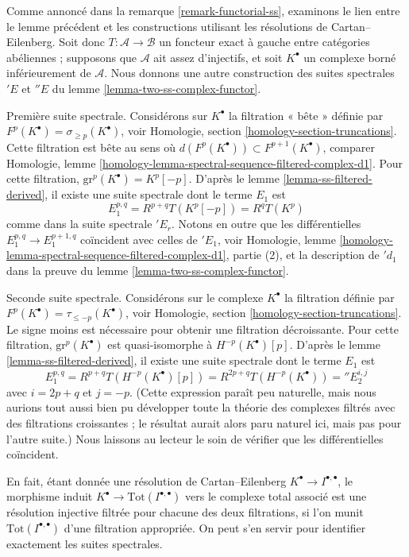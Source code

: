 \begin{remark}
\label{remark-final-functorial}
Comme annoncé dans la remarque \ref{remark-functorial-ss}, examinons le lien
entre le lemme précédent et les constructions utilisant les résolutions de
Cartan--Eilenberg. Soit donc $T : \mathcal{A} \to \mathcal{B}$ un foncteur
exact à gauche entre catégories abéliennes ; supposons que $\mathcal{A}$ ait
assez d'injectifs, et soit $K^\bullet$ un complexe borné inférieurement de
$\mathcal{A}$. Nous donnons une autre construction des suites spectrales
${}'E$ et ${}''E$ du lemme
\ref{lemma-two-ss-complex-functor}.

\medskip\noindent
Première suite spectrale. Considérons sur $K^\bullet$ la filtration « bête »
définie par $F^p(K^\bullet) = \sigma_{\geq p}(K^\bullet)$, voir Homologie,
section \ref{homology-section-truncations}.
Cette filtration est bête au sens où
$d(F^p(K^\bullet)) \subset F^{p + 1}(K^\bullet)$, comparer Homologie, lemme
\ref{homology-lemma-spectral-sequence-filtered-complex-d1}.
Pour cette filtration,
$\text{gr}^p(K^\bullet) = K^p[-p]$.
D'après le lemme \ref{lemma-ss-filtered-derived}, il existe une suite spectrale
dont le terme $E_1$ est
$$
E_1^{p, q} = R^{p + q}T(K^p[-p]) = R^qT(K^p)
$$
comme dans la suite spectrale ${}'E_r$. Notons en outre que les différentielles
$E_1^{p, q} \to E_1^{p + 1, q}$ coïncident avec celles de $'{}E_1$, voir
Homologie, lemme
\ref{homology-lemma-spectral-sequence-filtered-complex-d1}, partie (2), et la
description de ${}'d_1$ dans la preuve du
lemme \ref{lemma-two-ss-complex-functor}.

\medskip\noindent
Seconde suite spectrale. Considérons sur le complexe $K^\bullet$ la filtration
définie par $F^p(K^\bullet) = \tau_{\leq -p}(K^\bullet)$, voir Homologie,
section \ref{homology-section-truncations}.
Le signe moins est nécessaire pour obtenir une filtration décroissante.
Pour cette filtration, $\text{gr}^p(K^\bullet)$ est quasi-isomorphe à
$H^{-p}(K^\bullet)[p]$.
D'après le lemme \ref{lemma-ss-filtered-derived}, il existe une suite spectrale
dont le terme $E_1$ est
$$
E_1^{p, q} = R^{p + q}T(H^{-p}(K^\bullet)[p])
= R^{2p + q}T(H^{-p}(K^\bullet)) = {}''E_2^{i, j}
$$
avec $i = 2p + q$ et $j = -p$. (Cette expression paraît peu naturelle, mais
nous aurions tout aussi bien pu développer toute la théorie des complexes
filtrés avec des filtrations croissantes ; le résultat aurait alors paru
naturel ici, mais pas pour l'autre suite.) Nous laissons au lecteur le soin de
vérifier que les différentielles coïncident.

\medskip\noindent
En fait, étant donnée une résolution de Cartan--Eilenberg
$K^\bullet \to I^{\bullet, \bullet}$, le morphisme induit
$K^\bullet \to \text{Tot}(I^{\bullet, \bullet})$ vers le complexe total
associé est une résolution injective filtrée pour chacune des deux filtrations,
si l'on munit $\text{Tot}(I^{\bullet, \bullet})$ d'une filtration appropriée.
On peut s'en servir pour identifier exactement les suites spectrales.
\end{remark}

